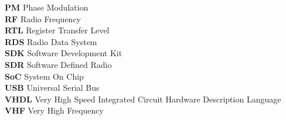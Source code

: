\begin{tabbing}
\textbf{PM}        \> Phase Modulation\\
\textbf{RF}        \> Radio Frequency\\
\textbf{RTL}       \> Register Transfer Level\\
\textbf{RDS}       \> Radio Data System\\
\textbf{SDK}       \> Software Development Kit\\
\textbf{SDR}       \> Software Defined Radio\\
\textbf{SoC}       \> System On Chip\\
\textbf{USB}       \> Universal Serial Bus\\
\textbf{VHDL}      \> Very High Speed Integrated Circuit Hardware Description Language\\
\textbf{VHF}       \> Very High Frequency
\end{tabbing}
